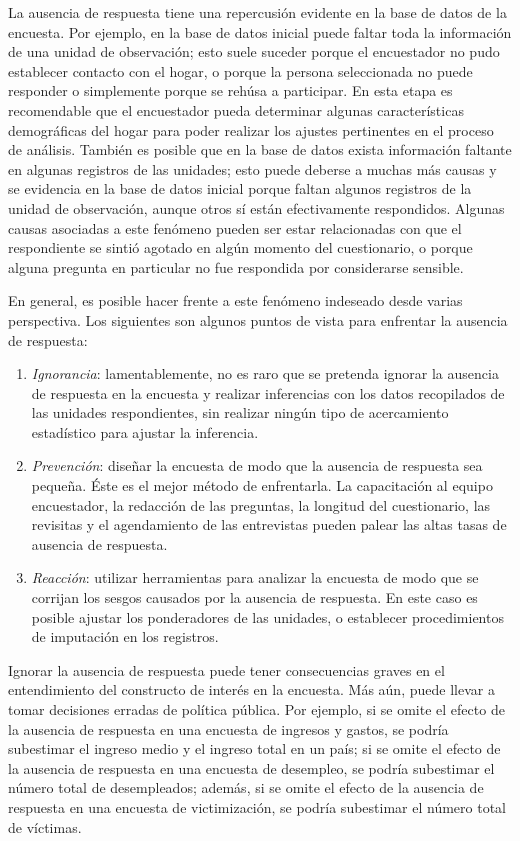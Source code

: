 \documentclass[
  12pt,
]{book}
\providecommand{\tightlist}{%
  \setlength{\itemsep}{0pt}\setlength{\parskip}{0pt}}
\begin{document}
La ausencia de respuesta tiene una repercusión evidente en la base de datos de la encuesta. Por ejemplo, en la base de datos inicial puede faltar toda la información de una unidad de observación; esto suele suceder porque el encuestador no pudo establecer contacto con el hogar, o porque la persona seleccionada no puede responder o simplemente porque se rehúsa a participar. En esta etapa es recomendable que el encuestador pueda determinar algunas características demográficas del hogar para poder realizar los ajustes pertinentes en el proceso de análisis. También es posible que en la base de datos exista información faltante en algunas registros de las unidades; esto puede deberse a muchas más causas y se evidencia en la base de datos inicial porque faltan algunos registros de la unidad de observación, aunque otros sí están efectivamente respondidos. Algunas causas asociadas a este fenómeno pueden ser estar relacionadas con que el respondiente se sintió agotado en algún momento del cuestionario, o porque alguna pregunta en particular no fue respondida por considerarse sensible.

En general, es posible hacer frente a este fenómeno indeseado desde varias perspectiva. Los siguientes son algunos puntos de vista para enfrentar la ausencia de respuesta:

\begin{enumerate}
\def\labelenumi{\arabic{enumi}.}
\tightlist
\item
  \emph{Ignorancia}: lamentablemente, no es raro que se pretenda ignorar la ausencia de respuesta en la encuesta y realizar inferencias con los datos recopilados de las unidades respondientes, sin realizar ningún tipo de acercamiento estadístico para ajustar la inferencia.
\item
  \emph{Prevención}: diseñar la encuesta de modo que la ausencia de respuesta sea pequeña. Éste es el mejor método de enfrentarla. La capacitación al equipo encuestador, la redacción de las preguntas, la longitud del cuestionario, las revisitas y el agendamiento de las entrevistas pueden palear las altas tasas de ausencia de respuesta.
\item
  \emph{Reacción}: utilizar herramientas para analizar la encuesta de modo que se corrijan los sesgos causados por la ausencia de respuesta. En este caso es posible ajustar los ponderadores de las unidades, o establecer procedimientos de imputación en los registros.
\end{enumerate}

Ignorar la ausencia de respuesta puede tener consecuencias graves en el entendimiento del constructo de interés en la encuesta. Más aún, puede llevar a tomar decisiones erradas de política pública. Por ejemplo, si se omite el efecto de la ausencia de respuesta en una encuesta de ingresos y gastos, se podría subestimar el ingreso medio y el ingreso total en un país; si se omite el efecto de la ausencia de respuesta en una encuesta de desempleo, se podría subestimar el número total de desempleados; además, si se omite el efecto de la ausencia de respuesta en una encuesta de victimización, se podría subestimar el número total de víctimas.
\end{document}
